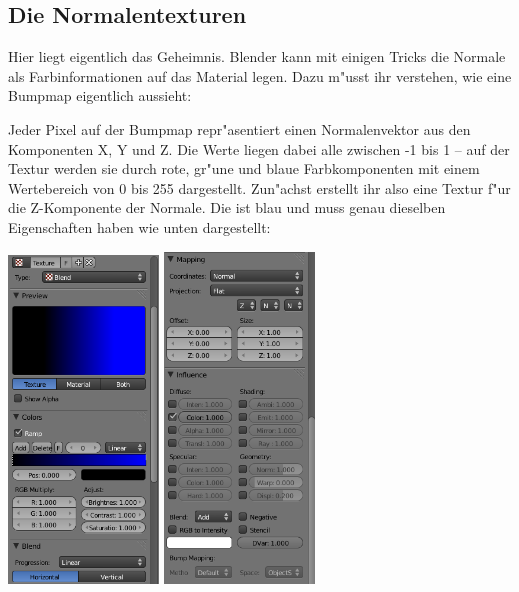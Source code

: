 \documentclass[a4paper]{article}
\begin{document}
\subsection{Die Normalentexturen}
Hier liegt eigentlich das Geheimnis. Blender kann mit einigen Tricks die Normale als Farbinformationen auf das Material legen. Dazu m"usst ihr verstehen,
wie eine Bumpmap eigentlich aussieht:

Jeder Pixel auf der Bumpmap repr"asentiert einen Normalenvektor aus den Komponenten X, Y und Z. Die Werte liegen dabei alle zwischen -1 bis 1 -- auf der
Textur werden sie durch rote, gr"une und blaue Farbkomponenten mit einem Wertebereich von 0 bis 255 dargestellt. Zun"achst erstellt ihr also eine Textur
f"ur die Z-Komponente der Normale. Die ist blau und muss genau dieselben Eigenschaften haben wie unten dargestellt:

\begin{center}
\includegraphics[width=40mm]{../images/blender/bumpmap-texture-1.png}
\includegraphics[width=40mm]{../images/blender/bumpmap-texture-2.png}
\end{center}
\end{document}
